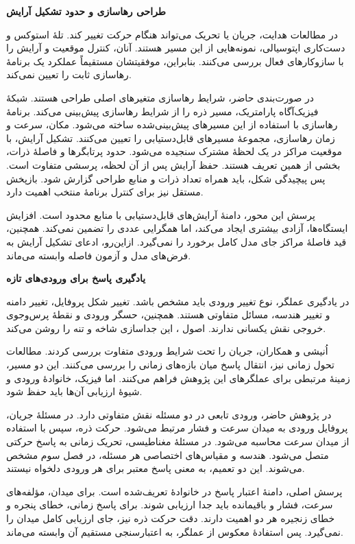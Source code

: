 \textbf{طراحی رهاسازی و حدود تشکیل آرایش}

در مطالعات هدایت، جریان یا تحریک می‌تواند هنگام حرکت تغییر کند.
تلهٔ استوکس و دست‌کاری اپتوسیالی، نمونه‌هایی از این مسیر هستند.
آنان، کنترل موقعیت و آرایش را با سازوکارهای فعال بررسی می‌کنند.
بنابراین، موفقیتشان مستقیماً عملکرد یک برنامهٔ رهاسازی ثابت را تعیین نمی‌کند.
\cite{Shenoy2016StokesTrap,Erben2024Optofluidic}

در صورت‌بندی حاضر، شرایط رهاسازی متغیرهای اصلی طراحی هستند.
شبکهٔ فیزیک‌آگاه پارامتریک، مسیر ذره را از شرایط رهاسازی پیش‌بینی می‌کند.
برنامهٔ رهاسازی با استفاده از این مسیرهای پیش‌بینی‌شده ساخته می‌شود.
مکان، سرعت و زمان رهاسازی، مجموعهٔ مسیرهای قابل‌دستیابی را تعیین می‌کنند.
تشکیل آرایش، با موقعیت مراکز در یک لحظهٔ مشترک سنجیده می‌شود.
حدود پرتابگرها و فاصلهٔ ذرات، بخشی از همین تعریف هستند.
حفظ آرایش پس از آن لحظه، پرسشی متفاوت است.
پس پیچیدگی شکل، باید همراه تعداد ذرات و منابع طراحی گزارش شود.
بازپخش مستقل نیز برای کنترل برنامهٔ منتخب اهمیت دارد.

پرسش این محور، دامنهٔ آرایش‌های قابل‌دستیابی با منابع محدود است.
افزایش ایستگاه‌ها، آزادی بیشتری ایجاد می‌کند، اما همگرایی عددی را تضمین نمی‌کند.
همچنین، قید فاصلهٔ مراکز جای مدل کامل برخورد را نمی‌گیرد.
ازاین‌رو، ادعای تشکیل آرایش به فرض‌های مدل و آزمون فاصله وابسته می‌ماند.

\textbf{یادگیری پاسخ برای ورودی‌های تازه}

در یادگیری عملگر، نوع تغییر ورودی باید مشخص باشد.
تغییر شکل پروفایل، تغییر دامنه و تغییر هندسه، مسائل متفاوتی هستند.
همچنین، حسگر ورودی و نقطهٔ پرس‌وجوی خروجی نقش یکسانی ندارند.
اصول ، این جداسازی شاخه و تنه را روشن می‌کند.
\cite{lu2021deeponet}

اُنیشی و همکاران، جریان را تحت شرایط ورودی متفاوت بررسی کردند.
مطالعات تحول زمانی نیز، انتقال پاسخ میان بازه‌های زمانی را بررسی می‌کنند.
این دو مسیر، زمینهٔ مرتبطی برای عملگرهای این پژوهش فراهم می‌کنند.
اما فیزیک، خانوادهٔ ورودی و شیوهٔ ارزیابی آن‌ها باید حفظ شود.
\cite{Onishi2026FlowConditions,Wang2023LongTime}

در پژوهش حاضر، ورودی تابعی در دو مسئله نقش متفاوتی دارد.
در مسئلهٔ جریان، پروفایل ورودی به میدان سرعت و فشار مرتبط می‌شود.
حرکت ذره، سپس با استفاده از میدان سرعت محاسبه می‌شود.
در مسئلهٔ مغناطیسی، تحریک زمانی به پاسخ حرکتی متصل می‌شود.
هندسه و مقیاس‌های اختصاصی هر مسئله، در فصل سوم مشخص می‌شوند.
این دو تعمیم، به معنی پاسخ معتبر برای هر ورودی دلخواه نیستند.

پرسش اصلی، دامنهٔ اعتبار پاسخ در خانوادهٔ تعریف‌شده است.
برای میدان، مؤلفه‌های سرعت، فشار و باقیمانده باید جدا ارزیابی شوند.
برای پاسخ زمانی، خطای پنجره و خطای زنجیره هر دو اهمیت دارند.
دقت حرکت ذره نیز، جای ارزیابی کامل میدان را نمی‌گیرد.
پس استفادهٔ معکوس از عملگر، به اعتبارسنجی مستقیم آن وابسته می‌ماند.

